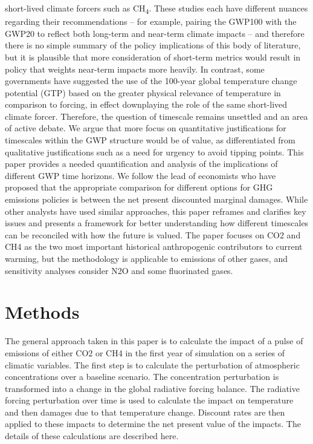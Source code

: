 \documentclass[gc, manuscript]{copernicus}
\begin{document}
short-lived climate forcers such as CH\textsubscript{4}. These studies
each have different nuances regarding their recommendations -- for
example, pairing the GWP100 with the GWP20 to reflect both long-term and
near-term climate impacts -- and therefore there is no simple summary of
the policy implications of this body of literature, but it is plausible
that more consideration of short-term metrics would result in policy
that weights near-term impacts more heavily. In contrast, some
governments have suggested the use of the 100-year global temperature
change potential (GTP) based on the greater physical relevance of
temperature in comparison to forcing, in effect downplaying the role of
the same short-lived climate forcer. Therefore, the question of
timescale remains unsettled and an area of active debate. We argue that
more focus on quantitative justifications for timescales within the GWP
structure would be of value, as differentiated from qualitative
justifications such as a need for urgency to avoid tipping points. This
paper provides a needed quantification and analysis of the implications
of different GWP time horizons. We follow the lead of economists who
have proposed that the appropriate comparison for different options for
GHG emissions policies is between the net present discounted marginal
damages. While other analysts have used similar approaches, this paper
reframes and clarifies key issues and presents a framework for better
understanding how different timescales can be reconciled with how the
future is valued. The paper focuses on CO2 and CH4 as the two most
important historical anthropogenic contributors to current warming, but
the methodology is applicable to emissions of other gases, and
sensitivity analyses consider N2O and some fluorinated gases.

\section{Methods}

The general approach taken in this paper is to calculate the impact of a
pulse of emissions of either CO2 or CH4 in the first year of simulation
on a series of climatic variables. The first step is to calculate the
perturbation of atmospheric concentrations over a baseline scenario. The
concentration perturbation is transformed into a change in the global
radiative forcing balance. The radiative forcing perturbation over time
is used to calculate the impact on temperature and then damages due to
that temperature change. Discount rates are then applied to these
impacts to determine the net present value of the impacts. The details
of these calculations are described here.
\end{document}
